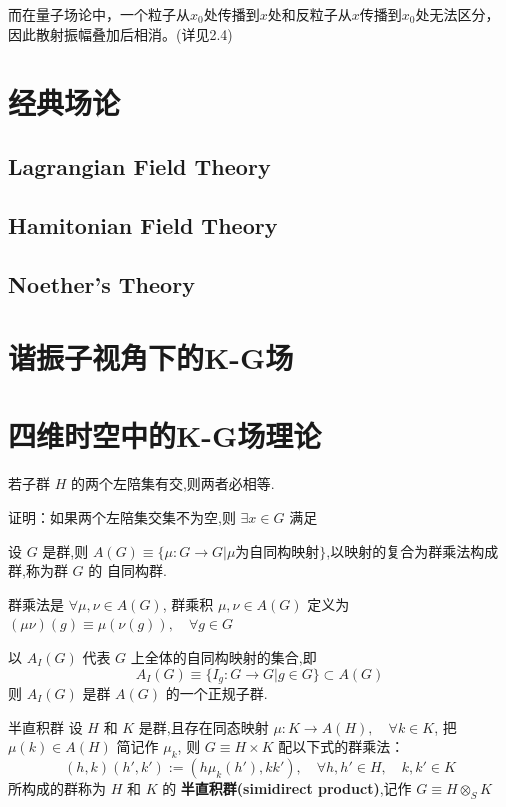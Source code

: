 \documentclass[../main.tex]{subfiles}
\begin{document}
    而在量子场论中，一个粒子从$x_0$处传播到$x$处和反粒子从$x$传播到$x_0$处无法区分，因此散射振幅叠加后相消。(详见2.4)
\section{经典场论}
\subsection{Lagrangian Field Theory}
\subsection{Hamitonian Field Theory}
\subsection{Noether's Theory}
\section{谐振子视角下的K-G场}
\section{四维时空中的K-G场理论}
\begin{note}
    若子群 $H$ 的两个左陪集有交,则两者必相等.
\end{note}
    \noindent
    证明：如果两个左陪集交集不为空,则 $\exists x \in G$ 满足

\begin{definition}
    设 $G$ 是群,则 $A(G)\equiv \{\mu:G\rightarrow G|\mu\text{为自同构映射}\}$,以映射的复合为群乘法构成群,称为群 $G$ 的 自同构群.

    群乘法是 $\forall \mu,\nu \in A(G)$, 群乘积 $\mu,\nu \in A(G)$ 定义为 $(\mu\nu)(g) \equiv \mu(\nu(g)),\quad \forall g \in G$
\end{definition}
\begin{theorem}
     以 $A_I(G)$ 代表 $G$ 上全体的自同构映射的集合,即
     $$
     A_I(G)\equiv\{I_g: G\rightarrow G|g \in G\}\subset A(G)
     $$
则 $A_I(G)$ 是群 $A(G)$ 的一个正规子群.
\end{theorem}
\begin{definition}{}{半直积群}
设 $H$ 和 $K$ 是群,且存在同态映射 $\mu:K\rightarrow A(H),\quad \forall k \in K$, 把 $\mu(k)\in A(H)$ 简记作 $\mu_k$, 则 $G\equiv H\times K$ 配以下式的群乘法：
    $$
    (h, k)(h', k'):=(h\mu_k(h'), kk'),\quad\forall h, h'\in H,\quad k, k' \in K
    $$
所构成的群称为 $H$ 和 $K$ 的 \textbf{半直积群(simidirect product)},记作 $G\equiv H\otimes_{S}K$
\end{definition}
\end{document}
